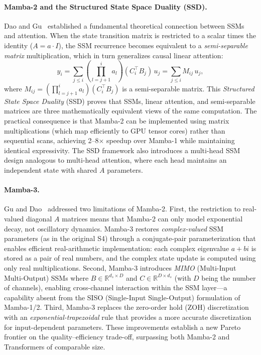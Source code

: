 \paragraph{Mamba-2 and the Structured State Space Duality (SSD).}
Dao and Gu~\cite{dao2024transformers} established a fundamental theoretical connection between SSMs and attention. When the state transition matrix is restricted to a scalar times the identity ($A = a \cdot I$), the SSM recurrence becomes equivalent to a \emph{semi-separable matrix} multiplication, which in turn generalizes causal linear attention:
\begin{equation}
y_i = \sum_{j \leq i} \left(\prod_{l=j+1}^{i} a_l\right) (C_i^\top B_j)\, u_j = \sum_{j \leq i} M_{ij}\, u_j,
\label{eq:ssd}
\end{equation}
where $M_{ij} = (\prod_{l=j+1}^{i} a_l)(C_i^\top B_j)$ is a semi-separable matrix. This \emph{Structured State Space Duality} (SSD) proves that SSMs, linear attention, and semi-separable matrices are three mathematically equivalent views of the same computation. The practical consequence is that Mamba-2 can be implemented using matrix multiplications (which map efficiently to GPU tensor cores) rather than sequential scans, achieving 2--8$\times$ speedup over Mamba-1 while maintaining identical expressivity. The SSD framework also introduces a multi-head SSM design analogous to multi-head attention, where each head maintains an independent state with shared $A$ parameters.

\paragraph{Mamba-3.}
Gu and Dao~\cite{gu2025mamba3} addressed two limitations of Mamba-2. First, the restriction to real-valued diagonal $A$ matrices means that Mamba-2 can only model exponential decay, not oscillatory dynamics. Mamba-3 restores \emph{complex-valued} SSM parameters (as in the original S4) through a conjugate-pair parameterization that enables efficient real-arithmetic implementation: each complex eigenvalue $a + bi$ is stored as a pair of real numbers, and the complex state update is computed using only real multiplications. Second, Mamba-3 introduces \emph{MIMO} (Multi-Input Multi-Output) SSMs where $B \in \mathbb{R}^{d_s \times D}$ and $C \in \mathbb{R}^{D \times d_s}$ (with $D$ being the number of channels), enabling cross-channel interaction within the SSM layer---a capability absent from the SISO (Single-Input Single-Output) formulation of Mamba-1/2. Third, Mamba-3 replaces the zero-order hold (ZOH) discretization with an \emph{exponential-trapezoidal} rule that provides a more accurate discretization for input-dependent parameters. These improvements establish a new Pareto frontier on the quality--efficiency trade-off, surpassing both Mamba-2 and Transformers of comparable size.

